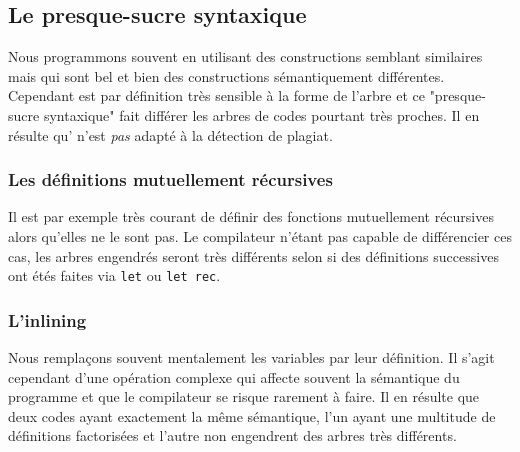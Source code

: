 
\subsection{Le presque-sucre syntaxique}

Nous programmons souvent en utilisant des constructions semblant similaires mais qui sont bel et bien des constructions sémantiquement différentes. Cependant {\Asak} est par définition très sensible à la forme de l'arbre {\LambdaCode} et ce "presque-sucre syntaxique" fait différer les arbres de codes pourtant très proches. Il en résulte qu'{\Asak} n'est \emph{pas} adapté à la détection de plagiat.

\subsubsection{Les définitions mutuellement récursives}

Il est par exemple très courant de définir des fonctions mutuellement récursives alors qu'elles ne le sont pas. Le compilateur n'étant pas capable de différencier ces cas, les arbres engendrés seront très différents selon si des définitions successives ont étés faites via \verb|let| ou \verb|let rec|.

\subsubsection{L'inlining}

Nous remplaçons souvent mentalement les variables par leur définition. Il s'agit cependant d'une opération complexe qui affecte souvent la sémantique du programme et que le compilateur se risque rarement à faire. Il en résulte que deux codes ayant exactement la même sémantique, l'un ayant une multitude de définitions factorisées et l'autre non engendrent des arbres très différents.